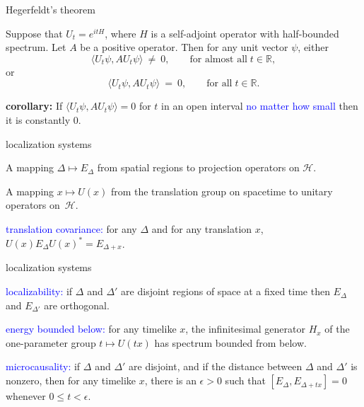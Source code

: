 \documentclass[8pt]{beamer}
\author{Hans Halvorson}
\date[November 2013]{November 12, 2013} \usetheme{Copenhagen}
\begin{document}
\def\2{\mathcal}
\def\7{\mathbb}
\newenvironment{proenv}{\only{\setbeamercolor{local structure}{fg=green}}}{}
\newenvironment{conenv}{\only{\setbeamercolor{local structure}{fg=red}}}{}  
\newenvironment{neuenv}{\only{\setbeamercolor{local
      structure}{fg=yellow}}}{}


\begin{frame}[plain]
  \titlepage
\end{frame}

\begin{frame}{Hegerfeldt's theorem}

  Suppose that $U_t=e^{itH}$, where $H$ is a self-adjoint operator
  with half-bounded spectrum.  Let $A$ be a positive operator.  Then
  for any unit vector $\psi$, either
$$ \langle U_t\psi ,AU_t\psi \rangle \: \neq \: 0,\qquad \text{for almost all} \; t\in \7R ,$$
or
$$ \langle U_t\psi ,AU_t\psi \rangle \: = \: 0,\qquad \text{for all} \; t\in\7R .$$

\bigskip \bigskip \textbf{corollary:} If $\langle U_t\psi
,AU_t\psi\rangle =0$ for $t$ in an open interval \textcolor{blue}{no
  matter how small} then it is constantly $0$.

\end{frame}

\begin{frame}{localization systems}

  A mapping $\Delta\mapsto E_{\Delta}$ from spatial regions to
  projection operators on $\2H$.

  \bigskip A mapping $x\mapsto U(x)$ from the translation group on
  spacetime to unitary operators on~$\2H$.

  \bigskip \textcolor{blue}{translation covariance:} for any $\Delta$
  and for any translation $x$, $U(x)E_\Delta U(x)^* = E_{\Delta +x}$.

\end{frame}


\begin{frame}{localization systems}

  \bigskip \textcolor{blue}{localizability:} if $\Delta$ and $\Delta
  '$ are disjoint regions of space at a fixed time then $E_\Delta$ and
  $E_{\Delta '}$ are orthogonal.

  \bigskip \textcolor{blue}{energy bounded below:} for any timelike
  $x$, the infinitesimal generator $H_x$ of the one-parameter group
  $t\mapsto U(tx)$ has spectrum bounded from below.

  \bigskip \textcolor{blue}{microcausality:} if $\Delta$ and $\Delta
  '$ are disjoint, and if the distance between $\Delta$ and $\Delta '$
  is nonzero, then for any timelike $x$, there is an $\epsilon >0$
  such that $[E_\Delta ,E_{\Delta +tx}]=0$ whenever $0\leq
  t<\epsilon$.


\end{frame}
\end{document}
